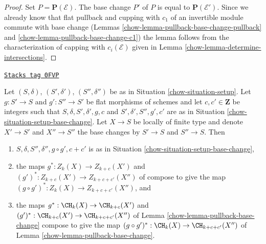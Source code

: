\begin{proof}

Set $P = \mathbf{P}(\mathcal{E})$. The base change $P'$ of $P$
is equal to $\mathbf{P}(\mathcal{E}')$. Since we already know that
flat pullback and cupping with $c_1$ of an invertible module
commute with base change (Lemmas \ref{chow-lemma-pullback-base-change-pullback} and
\ref{chow-lemma-pullback-base-change-c1})
the lemma follows from the characterization of capping
with $c_i(\mathcal{E})$ given in Lemma \ref{chow-lemma-determine-intersections}.
\end{proof}

\begin{lemma}
\label{chow-lemma-compose-base-change}
\href{https://stacks.math.columbia.edu/tag/0FVP}{\texttt{Stacks tag 0FVP}}

Let $(S, \delta)$, $(S', \delta')$, $(S'', \delta'')$ be as in
Situation \ref{chow-situation-setup}. Let $g : S' \to S$ and $g' : S'' \to S'$
be flat morphisms of schemes and let $c, c' \in \mathbf{Z}$
be integers such that $S, \delta, S', \delta', g, c$ and
$S', \delta', S'', g', c'$ are as in
Situation \ref{chow-situation-setup-base-change}.
Let $X \to S$ be locally of finite type and denote $X' \to S'$
and $X'' \to S''$ the base changes by $S' \to S$ and $S'' \to S$.
Then
\begin{enumerate}
\item $S, \delta, S'', \delta'', g \circ g', c + c'$ is as in
Situation \ref{chow-situation-setup-base-change},
\item the maps $g^* : Z_k(X) \to Z_{k + c}(X')$ and
$(g')^* : Z_{k + c}(X') \to Z_{k + c + c'}(X'')$ of
compose to give the map $(g \circ g')^* : Z_k(X) \to Z_{k + c + c'}(X'')$, and
\item the maps $g^* : \CH_k(X) \to \CH_{k + c}(X')$ and
$(g')^* : \CH_{k + c}(X') \to \CH_{k + c + c'}(X'')$ of
Lemma \ref{chow-lemma-pullback-base-change}
compose to give the map $(g \circ g')^* : \CH_k(X) \to \CH_{k + c + c'}(X'')$
of Lemma \ref{chow-lemma-pullback-base-change}.
\end{enumerate}
\end{lemma}

